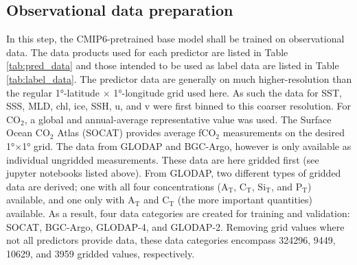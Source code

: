 \documentclass{article}
\begin{document}
	\subsection{Observational data preparation}
	In this step, the CMIP6-pretrained base model shall be trained on observational data. The data products used for each predictor are listed in Table\,\ref{tab:pred_data} and those intended to be used as label data are listed in Table\,\ref{tab:label_data}. The predictor data are generally on much higher-resolution than the regular 1°-latitude $\times$ 1°-longitude grid used here. As such the data for SST, SSS, MLD, chl, ice, SSH, u, and v were first binned to this coarser resolution. For CO$_2$, a global and annual-average representative value was used. The Surface Ocean CO$_2$ Atlas (SOCAT) provides average fCO$_2$ measurements on the desired 1°$\times$1° grid. The data from GLODAP and BGC-Argo, however is only available as individual ungridded measurements. These data are here gridded first (see jupyter notebooks listed above). From GLODAP, two different types of gridded data are derived; one with all four concentrations (A$_\text{T}$, C$_\text{T}$, Si$_\text{T}$, and P$_\text{T}$) available, and one only with A$_\text{T}$ and C$_\text{T}$ (the more important quantities) available. As a result, four data categories are created for training and validation: SOCAT, BGC-Argo, GLODAP-4, and GLODAP-2. Removing grid values where not all predictors provide data, these data categories encompass 324296, 9449, 10629, and 3959 gridded values, respectively. 
	
\end{document}
